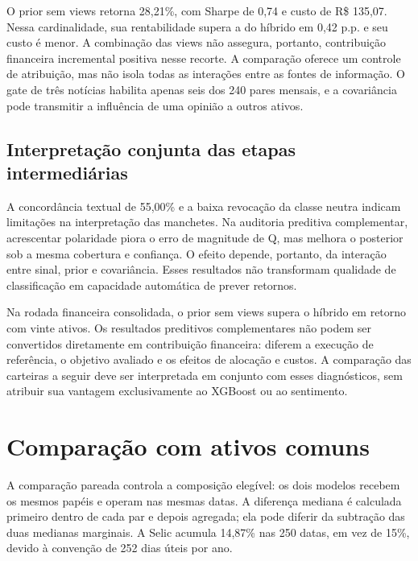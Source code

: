 O prior sem views retorna 28,21\%, com Sharpe de 0,74 e custo de R\$ 135,07. Nessa cardinalidade, sua rentabilidade supera a do híbrido em 0,42 p.p. e seu custo é menor. A combinação das views não assegura, portanto, contribuição financeira incremental positiva nesse recorte. A comparação oferece um controle de atribuição, mas não isola todas as interações entre as fontes de informação. O gate de três notícias habilita apenas seis dos 240 pares mensais, e a covariância pode transmitir a influência de uma opinião a outros ativos.

\subsection*{Interpretação conjunta das etapas intermediárias}
A concordância textual de 55,00\% e a baixa revocação da classe neutra indicam limitações na interpretação das manchetes. Na auditoria preditiva complementar, acrescentar polaridade piora o erro de magnitude de Q, mas melhora o posterior sob a mesma cobertura e confiança. O efeito depende, portanto, da interação entre sinal, prior e covariância. Esses resultados não transformam qualidade de classificação em capacidade automática de prever retornos.

Na rodada financeira consolidada, o prior sem views supera o híbrido em retorno com vinte ativos. Os resultados preditivos complementares não podem ser convertidos diretamente em contribuição financeira: diferem a execução de referência, o objetivo avaliado e os efeitos de alocação e custos. A comparação das carteiras a seguir deve ser interpretada em conjunto com esses diagnósticos, sem atribuir sua vantagem exclusivamente ao XGBoost ou ao sentimento.
\section{Comparação com ativos comuns}
A comparação pareada controla a composição elegível: os dois modelos recebem os mesmos papéis e operam nas mesmas datas. A diferença mediana é calculada primeiro dentro de cada par e depois agregada; ela pode diferir da subtração das duas medianas marginais. A Selic acumula 14,87\% nas 250 datas, em vez de 15\%, devido à convenção de 252 dias úteis por ano.

